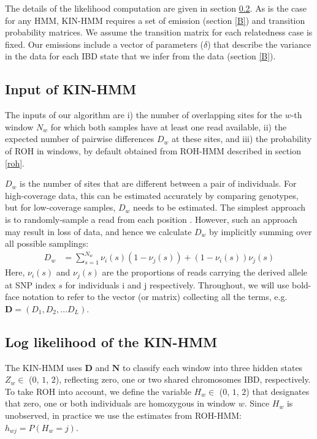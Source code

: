 \documentclass[12pt, letterpaper]{article}
\newcommand{\BD}{\mathbf{D}}
\newcommand{\BN}{\mathbf{N}}
\begin{document}
The details of the likelihood computation are given in section \ref{ll}. As is the case for any HMM, KIN-HMM requires a set of emission (section \ref{B}) and transition probability matrices. We assume the transition matrix for each relatedness case is fixed. Our emissions include a vector of parameters ($\delta$) that describe the variance in the data for each IBD state that we infer from the data (section \ref{B}).

\subsection{Input of KIN-HMM}\label{hmm_input}
The inputs of our algorithm are i) the number of overlapping sites for the $w$-th window $N_w$ for which both samples have at least one read available, ii) the expected number of pairwise differences $D_w$ at these sites, and iii) the probability of ROH in windows, by default obtained from ROH-HMM described in section \ref{roh}.

$D_w$ is the number of sites that are different between a pair of individuals. For high-coverage data, this can be estimated accurately by comparing genotypes, but for low-coverage samples, $D_w$ needs to be estimated. The simplest approach is to randomly-sample a read from each position \cite{haak_massive_2015,prufer_complete_2014,green_draft_2010}. However, such an approach may result in loss of data, and hence we calculate $D_w$ by implicitly summing over all possible samplings:
\begin{align}\label{eq:x}
D_w &= \sum_{s=1}^{N_w} \nu_i(s) (1-\nu_j(s)) + (1-\nu_i(s)) \nu_j(s)
\end{align}
Here, $\nu_i(s)$ and $\nu_j(s)$ are the proportions of reads carrying the derived allele at SNP index $s$ for individuals i and j respectively.
Throughout, we will use bold-face notation to refer to the vector (or matrix) collecting  all the terms, e.g. $\BD = (D_1, D_2, \dots D_L)$. 


\subsection{Log likelihood of the KIN-HMM}\label{ll}
The KIN-HMM uses $\BD$ and $\BN$ to classify each window into three hidden states $Z_w \in$ ($0$, $1$, $2$), reflecting zero, one or two shared chromosomes IBD, respectively. To take ROH into account, we define the variable $H_w \in$ ($0$, $1$, $2$) that designates that zero, one or both individuals are homozygous in window $w$. Since $H_w$ is unobserved, in practice we use the estimates from ROH-HMM: $h_{wj} = P(H_w = j)$. 
\end{document}
